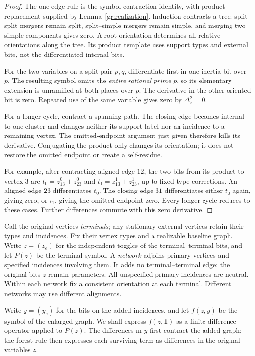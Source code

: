 \begin{proof}
The one-edge rule is the symbol contraction identity, with product
replacement supplied by Lemma~\ref{gr:realization}.  Induction contracts
a tree: split--split mergers remain split, split--simple mergers remain
simple, and merging two simple components gives zero.  A root orientation
determines all relative orientations along the tree.  Its product template
uses support types and external bits, not the differentiated internal bits.

For the two variables on a split pair $p,q$, differentiate first in one
inertia bit over $p$.  The resulting symbol omits the \emph{entire rational
prime} $p$, so its elementary extension is unramified at both places over
$p$.  The derivative in the other oriented bit is zero.  Repeated use of
the same variable gives zero by $\Delta_z^2=0$.

For a longer cycle, contract a spanning path.  The closing edge becomes
internal to one cluster and changes neither its support label nor an
incidence to a remaining vertex.  The omitted-endpoint argument just given
therefore kills its derivative.  Conjugating the product only changes its
orientation; it does not restore the omitted endpoint or create a
self-residue.

For example, after contracting aligned edge $12$, the two bits from its
product to vertex $3$ are
$t_0=z_{13}^0+z_{23}^0$ and $t_1=z_{13}^1+z_{23}^1$, up to fixed type
corrections.  An aligned edge $23$ differentiates $t_0$.  The closing
edge $31$ differentiates either $t_0$ again, giving zero, or $t_1$, giving
the omitted-endpoint zero.  Every longer cycle reduces to these cases.
Further differences commute with this zero derivative.
\end{proof}

Call the original vertices \emph{terminals}; any stationary external
vertices retain their types and incidences. Fix their vertex types and a
realizable baseline graph. Write $z=(z_e)$ for the independent toggles of
the terminal--terminal bits, and let $P(z)$ be the terminal symbol.
A \emph{network} adjoins primary vertices and specified incidences
involving them. It adds no terminal--terminal edge: the original bits
$z$ remain parameters. All unspecified primary incidences are neutral.
Within each network fix a consistent orientation at each terminal.
Different networks may use different alignments.

Write $y=(y_e)$ for the bits on the added incidences, and let $f(z,y)$
be the symbol of the enlarged graph. We shall express $f(z,\mathbf1)$
as a finite-difference operator applied to $P(z)$. The differences in
$y$ first contract the added graph; the forest rule then expresses each
surviving term as differences in the original variables $z$.

